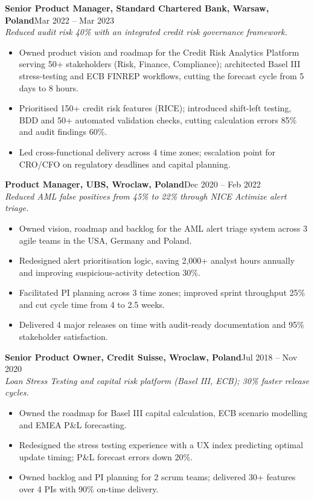 \documentclass[10pt,letterpaper]{article}
\newcommand{\role}[3]{%
  \needspace{5\baselineskip}%
  {\fontsize{11}{13}\selectfont\bfseries #1}\hfill{\fontsize{11}{13}\selectfont #2}\\
  {\itshape #3}%
}
\newcommand{\gap}{\vspace{6.5pt}}
\begin{document}
\role{Senior Product Manager, Standard Chartered Bank, Warsaw, Poland}{Mar 2022 -- Mar 2023}
{Reduced audit risk 40\% with an integrated credit risk governance framework.}
\begin{itemize}
  \item Owned product vision and roadmap for the Credit Risk Analytics Platform serving 50+ stakeholders (Risk, Finance,
        Compliance); architected Basel III stress-testing and ECB FINREP workflows, cutting the forecast cycle from 5 days to 8 hours.
  \item Prioritised 150+ credit risk features (RICE); introduced shift-left testing, BDD and 50+ automated validation checks,
        cutting calculation errors 85\% and audit findings 60\%.
  \item Led cross-functional delivery across 4 time zones; escalation point for CRO/CFO on regulatory deadlines and capital planning.
\end{itemize}
\gap

\role{Product Manager, UBS, Wroclaw, Poland}{Dec 2020 -- Feb 2022}
{Reduced AML false positives from 45\% to 22\% through NICE Actimize alert triage.}
\begin{itemize}
  \item Owned vision, roadmap and backlog for the AML alert triage system across 3 agile teams in the USA, Germany and Poland.
  \item Redesigned alert prioritisation logic, saving 2,000+ analyst hours annually and improving suspicious-activity detection 30\%.
  \item Facilitated PI planning across 3 time zones; improved sprint throughput 25\% and cut cycle time from 4 to 2.5 weeks.
  \item Delivered 4 major releases on time with audit-ready documentation and 95\% stakeholder satisfaction.
\end{itemize}
\gap

\role{Senior Product Owner, Credit Suisse, Wroclaw, Poland}{Jul 2018 -- Nov 2020}
{Loan Stress Testing and capital risk platform (Basel III, ECB); 30\% faster release cycles.}
\begin{itemize}
  \item Owned the roadmap for Basel III capital calculation, ECB scenario modelling and EMEA P\&L forecasting.
  \item Redesigned the stress testing experience with a UX index predicting optimal update timing; P\&L forecast errors down 20\%.
  \item Owned backlog and PI planning for 2 scrum teams; delivered 30+ features over 4 PIs with 90\% on-time delivery.
\end{itemize}
\gap
\end{document}
